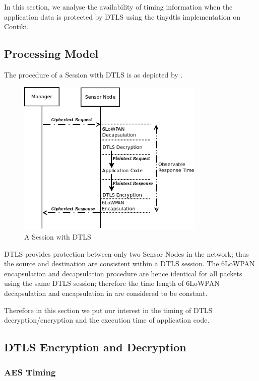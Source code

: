 In this section, we analyse the availability of timing information when the application data is protected by DTLS using the tinydtls implementation on Contiki.

\subsection{Processing Model}

The procedure of a Session with DTLS is as depicted by .

\begin{figure}[ht!]
	\center
	\includegraphics[width=0.8\textwidth]{fig/dtls_session.png}
	\caption{A Session with DTLS}
	\label{Fig: A Session with DTLS}
\end{figure}

DTLS provides protection between only two Sensor Nodes in the network; thus the source and destination are consistent within a DTLS session. The 6LoWPAN encapsulation and decapsulation procedure are hence identical for all packets using the same DTLS session; therefore the time length of 6LoWPAN decapsulation and encapsulation in  are considered to be constant.

Therefore in this section we put our interest in the timing of DTLS decryption/encryption and the execution time of application code.

\subsection{DTLS Encryption and Decryption}

\subsubsection{AES Timing}

